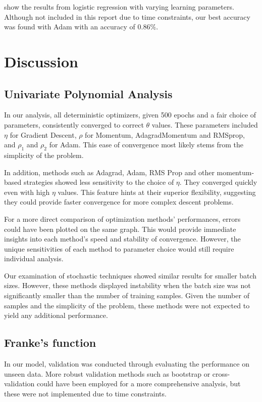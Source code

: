 \documentclass{article}
\theoremstyle{definition}
\begin{document}
 show the results from logistic regression with varying learning parameters. Although not included in this report due to time constraints, our best accuracy was found with Adam with an accuracy of $0.86\%$.

\newpage
\section{Discussion}

\subsection{Univariate Polynomial Analysis}
In our analysis, all deterministic optimizers, given 500 epochs and a fair choice of parameters, consistently converged to correct $\theta$ values. These parameters included $\eta$ for Gradient Descent, $\rho$ for Momentum, AdagradMomentum and RMSprop, and $\rho_1$ and $\rho_2$ for Adam. This ease of convergence most likely stems from the simplicity of the problem.

In addition, methods such as Adagrad, Adam, RMS Prop and other momentum-based strategies showed less sensitivity to the choice of $\eta$. They converged quickly even with high $\eta$ values. This feature hints at their superior flexibility, suggesting they could provide faster convergence for more complex descent problems.

For a more direct comparison of optimization methods' performances, errors could have been plotted on the same graph. This would provide immediate insights into each method's speed and stability of convergence. However, the unique sensitivities of each method to parameter choice would still require individual analysis.

Our examination of stochastic techniques showed similar results for smaller batch sizes. However, these methods displayed instability when the batch size was not significantly smaller than the number of training samples. Given the number of samples and the simplicity of the problem, these methods were not expected to yield any additional performance.


\subsection{Franke's function}
In our model, validation was conducted through evaluating the performance on unseen data. More robust validation methods such as bootstrap or cross-validation could have been employed for a more comprehensive analysis, but these were not implemented due to time constraints.
\end{document}
